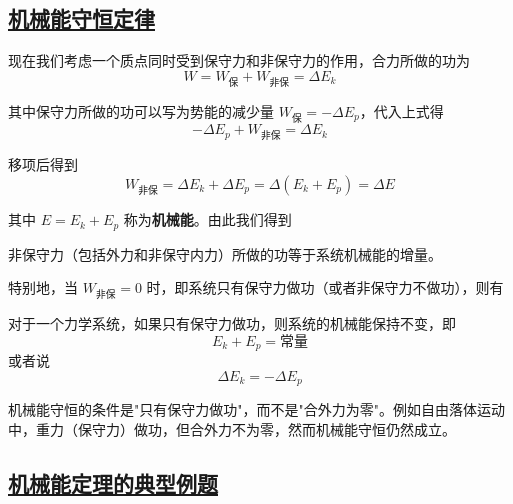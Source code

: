 \subsection{\protect\hyperlink{:}{机械能守恒定律}}

现在我们考虑一个质点同时受到保守力和非保守力的作用，合力所做的功为
\begin{equation}
    W = W_{\text{保}} + W_{\text{非保}} = \Delta E_k
\end{equation}

其中保守力所做的功可以写为势能的减少量 $W_{\text{保}} = -\Delta E_p$，代入上式得
\begin{equation}
    -\Delta E_p + W_{\text{非保}} = \Delta E_k
\end{equation}

移项后得到
\begin{equation}
    W_{\text{非保}} = \Delta E_k + \Delta E_p = \Delta(E_k + E_p) = \Delta E
\end{equation}

其中 $E = E_k + E_p$ 称为\textbf{机械能}。由此我们得到

\begin{theorem}[功能原理]
    非保守力（包括外力和非保守内力）所做的功等于系统机械能的增量。
\end{theorem}

特别地，当 $W_{\text{非保}} = 0$ 时，即系统只有保守力做功（或者非保守力不做功），则有

\begin{theorem}[机械能守恒定律]
    对于一个力学系统，如果只有保守力做功，则系统的机械能保持不变，即
    \begin{equation}
        E_k + E_p = \text{常量}
    \end{equation}
    或者说
    \begin{equation}
        \Delta E_k = -\Delta E_p
    \end{equation}
\end{theorem}

\begin{remark}
    机械能守恒的条件是"只有保守力做功"，而不是"合外力为零"。例如自由落体运动中，重力（保守力）做功，但合外力不为零，然而机械能守恒仍然成立。
\end{remark}

\subsection{\protect\hyperlink{:}{机械能定理的典型例题}}

